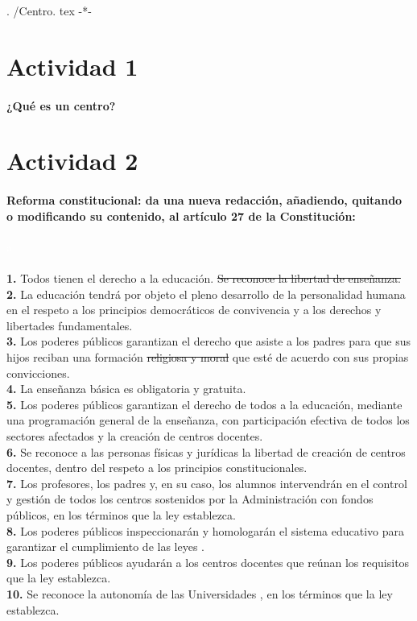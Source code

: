 .
/Centro.
tex -*-

\section{Actividad 1}

\paragraph{¿Qué es un centro?}


\section{Actividad 2}


\paragraph{Reforma constitucional: da una nueva redacción, añadiendo, quitando o modificando su contenido, al artículo 27 de la Constitución:}

\textcolor{white}{a}\\\\
\textbf{1.
} Todos tienen el derecho a la educación.
 \sout{Se reconoce la libertad de enseñanza.
}\\
\textbf{2.
} La educación tendrá por objeto el pleno desarrollo de la personalidad humana en el respeto a los principios democráticos de convivencia y a los derechos y libertades fundamentales.
 \\
\textbf{3.
} Los poderes públicos garantizan el derecho que asiste a los padres para que sus hijos reciban una formación \sout{religiosa y moral} que esté de acuerdo con sus propias convicciones.
 \\
\textbf{4.
} La enseñanza básica es obligatoria y gratuita.
\\
\textbf{5.
} Los poderes públicos garantizan el derecho de todos a la educación, mediante una programación general de la enseñanza, con participación efectiva de todos los sectores afectados y la creación de centros docentes.
 \\
\textbf{6.
} Se reconoce a las personas físicas y jurídicas la libertad de creación de centros docentes, dentro del respeto a los principios constitucionales.
 \\
\textbf{7.
} Los profesores, los padres y, en su caso, los alumnos intervendrán en el control y gestión de todos los centros sostenidos por la Administración con fondos públicos, en los términos que la ley establezca.
\\
\textbf{8.
} Los poderes públicos inspeccionarán y homologarán el sistema educativo para garantizar el cumplimiento de las leyes .
 \\
\textbf{9.
} Los poderes públicos ayudarán a los centros docentes que reúnan los requisitos que la ley establezca.
\\
\textbf{10.
} Se reconoce la autonomía de las Universidades , en los términos que la ley establezca.
\\


